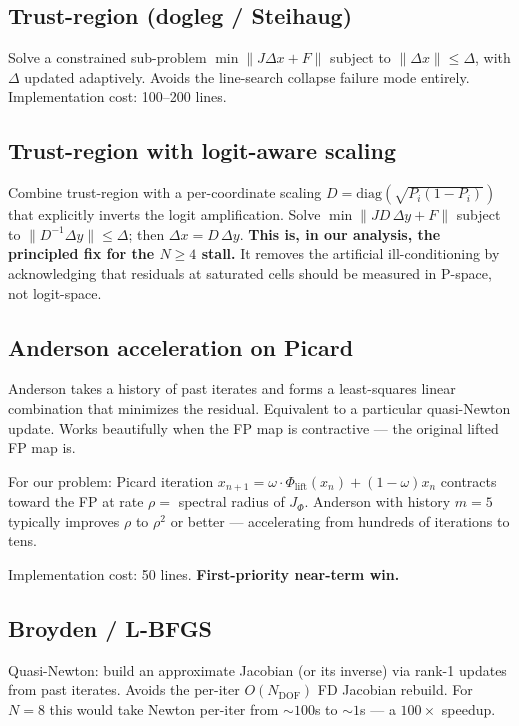 \documentclass[11pt]{article}
\begin{document}
\subsection{Trust-region (dogleg / Steihaug)}
Solve a constrained sub-problem $\min \|J\Delta x + F\|$ subject to $\|\Delta x\|\le\Delta$,
with $\Delta$ updated adaptively. Avoids the line-search collapse failure mode entirely.
Implementation cost: 100--200 lines.

\subsection{Trust-region with logit-aware scaling}
Combine trust-region with a per-coordinate scaling $D = \mathrm{diag}(\sqrt{P_i(1-P_i)})$
that explicitly inverts the logit amplification. Solve $\min\|JD\,\Delta y + F\|$ subject to
$\|D^{-1}\Delta y\|\le\Delta$; then $\Delta x = D\,\Delta y$. \textbf{This is, in our
analysis, the principled fix for the $N\ge 4$ stall.} It removes the artificial
ill-conditioning by acknowledging that residuals at saturated cells should be measured
in P-space, not logit-space.

\subsection{Anderson acceleration on Picard}
Anderson takes a history of past iterates and forms a least-squares linear combination
that minimizes the residual. Equivalent to a particular quasi-Newton update. Works
beautifully when the FP map is contractive — the original lifted FP map is.

For our problem: Picard iteration $x_{n+1} = \omega\cdot \Phi_{\mathrm{lift}}(x_n) + (1-\omega)x_n$
contracts toward the FP at rate $\rho = $ spectral radius of $J_\Phi$. Anderson with
history $m=5$ typically improves $\rho$ to $\rho^2$ or better — accelerating from
hundreds of iterations to tens.

Implementation cost: 50 lines. \textbf{First-priority near-term win.}

\subsection{Broyden / L-BFGS}
Quasi-Newton: build an approximate Jacobian (or its inverse) via rank-1 updates from past
iterates. Avoids the per-iter $O(N_{\mathrm{DOF}})$ FD Jacobian rebuild. For $N=8$ this would
take Newton per-iter from $\sim 100$s to $\sim 1$s — a $100\times$ speedup.
\end{document}

